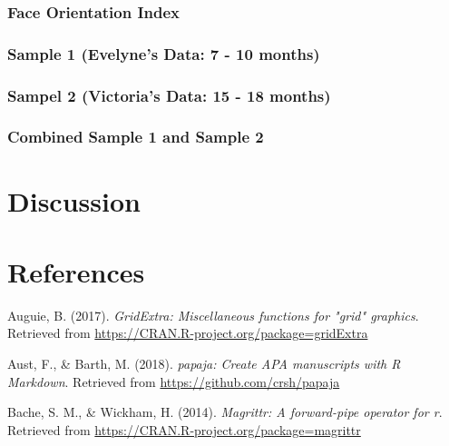 \documentclass[english,man,floatsintext]{apa6}
\begin{document}
\hypertarget{face-orientation-index-1}{%
\subsubsection{Face Orientation Index}\label{face-orientation-index-1}}

\hypertarget{sample-1-evelynes-data-7---10-months-5}{%
\subsubsection{Sample 1 (Evelyne's Data: 7 - 10 months)}\label{sample-1-evelynes-data-7---10-months-5}}

\hypertarget{sampel-2-victorias-data-15---18-months}{%
\subsubsection{Sampel 2 (Victoria's Data: 15 - 18 months)}\label{sampel-2-victorias-data-15---18-months}}

\hypertarget{combined-sample-1-and-sample-2}{%
\subsubsection{Combined Sample 1 and Sample 2}\label{combined-sample-1-and-sample-2}}

\hypertarget{discussion}{%
\section{Discussion}\label{discussion}}

\newpage

\hypertarget{references}{%
\section{References}\label{references}}

\begingroup
\setlength{\parindent}{-0.5in}
\setlength{\leftskip}{0.5in}

\hypertarget{refs}{}
\leavevmode\hypertarget{ref-R-gridExtra}{}%
Auguie, B. (2017). \emph{GridExtra: Miscellaneous functions for "grid" graphics}. Retrieved from \url{https://CRAN.R-project.org/package=gridExtra}

\leavevmode\hypertarget{ref-R-papaja}{}%
Aust, F., \& Barth, M. (2018). \emph{papaja: Create APA manuscripts with R Markdown}. Retrieved from \url{https://github.com/crsh/papaja}

\leavevmode\hypertarget{ref-R-magrittr}{}%
Bache, S. M., \& Wickham, H. (2014). \emph{Magrittr: A forward-pipe operator for r}. Retrieved from \url{https://CRAN.R-project.org/package=magrittr}
\end{document}
